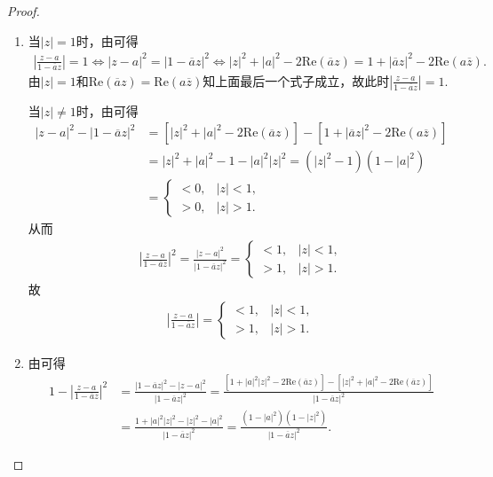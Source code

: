 \documentclass[../../main.tex]{subfiles}%
\begin{document}
\begin{proof}
\begin{enumerate}[(1)]
\item 当$|z|=1$时，由可得
\begin{align*}
\left| \frac{z-a}{1-\overline{a}z} \right|=1
\Longleftrightarrow |z-a|^2=|1-\overline{a}z|^2
\Longleftrightarrow |z|^2+|a|^2-2\mathrm{Re}\left( \overline{a}z \right) =1+|\overline{a}z|^2-2\mathrm{Re}\left( a\overline{z} \right) .
\end{align*}
由$|z|=1$和$\mathrm{Re}\left( \overline{a}z \right) =\mathrm{Re}\left( a\overline{z} \right)$知上面最后一个式子成立，故此时$\left| \frac{z-a}{1-\overline{a}z} \right|=1.$

当$|z|\ne 1$时，由可得
\begin{align*}
|z-a|^2-|1-\overline{a}z|^2
&=\left[ |z|^2+|a|^2-2\mathrm{Re}\left( \overline{a}z \right) \right] -\left[ 1+|\overline{a}z|^2-2\mathrm{Re}\left( a\overline{z} \right) \right] \\
&=|z|^2+|a|^2-1-|a|^2|z|^2
=\left( |z|^2-1 \right) \left( 1-|a|^2 \right) \\
&=
\begin{cases}
<0,&|z|<1,\\
>0,&|z|>1.
\end{cases}
\end{align*}
从而
\begin{align*}
\left| \frac{z-a}{1-\overline{a}z} \right|^2=\frac{|z-a|^2}{|1-\overline{a}z|^2}=
\begin{cases}
<1,&|z|<1,\\
>1,&|z|>1.
\end{cases}
\end{align*}
故
\begin{align*}
\left| \frac{z-a}{1-\overline{a}z} \right|=
\begin{cases}
<1,&|z|<1,\\
>1,&|z|>1.
\end{cases}
\end{align*}

\item 由可得
\begin{align*}
1-\left| \frac{z-a}{1-\overline{a}z} \right|^2
&=\frac{\left| 1-\overline{a}z \right|^2-\left| z-a \right|^2}{\left| 1-\overline{a}z \right|^2}=\frac{\left[ 1+\left| a \right|^2\left| z \right|^2-2\mathrm{Re}\left( \overline{a}z \right) \right] -\left[ \left| z \right|^2+\left| a \right|^2-2\mathrm{Re}\left( \overline{a}z \right) \right]}{\left| 1-\overline{a}z \right|^2}\\
&=\frac{1+\left| a \right|^2\left| z \right|^2-\left| z \right|^2-\left| a \right|^2}{\left| 1-\overline{a}z \right|^2}=\frac{\left( 1-\left| a \right|^2 \right) \left( 1-\left| z \right|^2 \right)}{\left| 1-\overline{a}z \right|^2}.
\end{align*}


\end{enumerate}
\end{proof}
\end{document}

